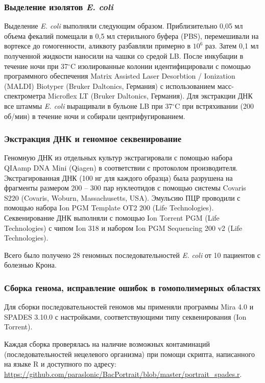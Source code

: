 \subsubsection*{Выделение изолятов \textit{E. coli}}

Выделение \textit{E. coli} выполняли следующим образом. Приблизительно 0,05 мл объема фекалий помещали в 0,5 мл стерильного буфера (PBS), перемешивали на вортексе до гомогенности, аликвоту разбавляли примерно в $10^6$ раз. Затем 0,1 мл полученной жидкости наносили на чашки со средой LB. После инкубации в течение ночи при 37$^\circ$C изолированные колонии идентифицировали с помощью программного обеспечения Matrix Assisted Laser Desorbtion / Ionization (MALDI) Biotyper (Bruker Daltonics, Германия) с использованием масс-спектрометра Microflex LT (Bruker Daltonics, Германия). Для экстракции ДНК все штаммы \textit{E. coli} выращивали в бульоне LB при 37$^\circ$C при встряхивании (200 об/мин) в течение ночи и собирали центрифугированием.

\subsubsection*{Экстракция ДНК и геномное секвенирование}

Геномную ДНК из отдельных культур экстрагировали с помощью набора QIAamp DNA Mini (Qiagen) в соответствии с протоколом производителя. Экстрагированная ДНК (100 нг для каждого образца) была разрушена на фрагменты размером 200 – 300 пар нуклеотидов с помощью системы Covaris S220 (Covaris, Woburn, Massachusetts, USA). Эмульсию ПЦР проводили с помощью набора Ion PGM Template OT2 200 (Life Technologies). Секвенирование ДНК выполняли с помощью Ion Torrent PGM (Life Technologies) с чипом Ion 318 и набором Ion PGM Sequencing 200 v2 (Life Technologies). 

Всего было получено 28 геномных последовательностей \textit{E. coli} от 10 пациентов с болезнью Крона.

\subsubsection*{Сборка генома, исправление ошибок в гомополимерных областях}
Для сборки последовательностей геномов мы применяли программы Mira 4.0 и SPADES 3.10.0 с настройками, соответствующими типу секвенирования (Ion Torrent).

Каждая сборка проверялась на наличие возможных контаминаций (последовательностей нецелевого организма) при помощи скрипта, написанного на языке R и доступного по адресу: \url{https://github.com/paraslonic/BacPortrait/blob/master/portrait\_spades.r}. 

